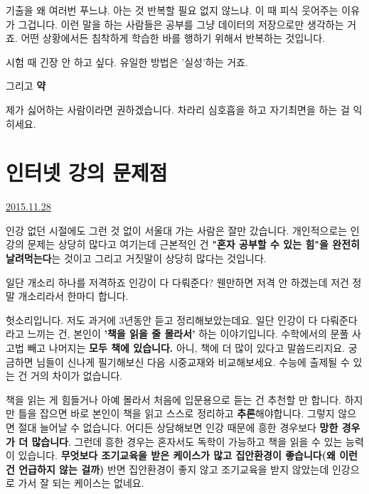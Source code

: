 기출을 왜 여러번 푸느냐. 아는 것 반복할 필요 없지 않느냐.
이 때 피식 웃어주는 이유가 그겁니다. 이런 말을 하는 사람들은 공부를 그냥 데이터의 저장으로만 생각하는 거죠.
어떤 상황에서든 침착하게 학습한 바를  행하기 위해서 반복하는 것입니다.
\vspace{5mm}

시험 때 긴장 안 하고 싶다. 유일한 방법은 '실성'하는 거죠.
\vspace{5mm}

그리고 \textbf{약}
\vspace{5mm}

제가 싫어하는 사람이라면 권하겠습니다.
차라리 심호흡을 하고 자기최면을 하는 걸 익히세요.
\vspace{5mm}





\section{인터넷 강의 문제점}
\href{https://www.kockoc.com/Apoc/514702}{2015.11.28}

\vspace{5mm}

인강 없던 시절에도 그런 것 없이 서울대 가는 사람은 잘만 갔습니다.
개인적으로는 인강의 문제는 상당히 많다고 여기는데
근본적인 건 \textbf{"혼자 공부할 수 있는 힘"을 완전히 날려먹는다}는 것이고
그리고 거짓말이 상당히 많다는 것입니다.
\vspace{5mm}

일단 개소리 하나를 저격하죠 인강이 다 다뤄준다?
웬만하면 저격 안 하겠는데 저건 정말 개소리라서 한마디 합니다.
\vspace{5mm}

헛소리입니다. 저도 과거에 3년동안 듣고 정리해보았는데요.
일단 인강이 다 다뤄준다라고 느끼는 건, 본인이 \textbf{'책을 읽을 줄 몰라서'} 하는 이야기입니다.
수학에서의 문풀 사고법 빼고 나머지는 \textbf{모두 책에 있습니다.} 아니, 책에 더 많이 있다고 말씀드리지요.
궁금하면 님들이 신나게 필기해보신 다음 시중교재와 비교해보세요. 수능에 출제될 수 있는 건 거의 차이가 없습니다.
\vspace{5mm}

책을 읽는 게 힘들거나 아예 몰라서 처음에 입문용으로 듣는 건 추천할 만 합니다.
하지만 틀을 잡으면 바로 본인이 책을 읽고 스스로 정리하고 \textbf{추론}해야합니다. 그렇지 않으면 절대 늘어날 수 없습니다.
어디든 상담해보면 인강 때문에 흥한 경우보다 \textbf{망한 경우가 더 많습니다}.
그런데 흥한 경우는 혼자서도 독학이 가능하고 책을 읽을 수 있는 능력이 있습니다.
\textbf{무엇보다 조기교육을 받은 케이스가 많고 집안환경이 좋습니다(왜 이런 건 언급하지 않는 걸까)}
반면 집안환경이 좋지 않고 조기교육을 받지 않았는데 인강으로 가서 잘 되는 케이스는 없네요.
\vspace{5mm}

